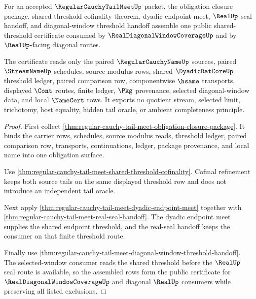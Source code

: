 \begin{theorem}
\label{thm:regular-cauchy-tail-meet-public-shared-threshold-certificate}
For an accepted $\RegularCauchyTailMeetUp$ packet, the obligation closure package, shared-threshold cofinality theorem, dyadic endpoint meet, $\RealUp$ seal handoff, and diagonal-window threshold handoff assemble one public shared-threshold certificate consumed by $\RealDiagonalWindowCoverageUp$ and by $\RealUp$-facing diagonal routes.

The certificate reads only the paired $\RegularCauchyNameUp$ sources, paired $\StreamNameUp$ schedules, source modulus rows, shared $\DyadicRatCoreUp$ threshold ledger, paired comparison row, componentwise $\hsame$ transports, displayed $\Cont$ routes, finite ledger, $\Pkg$ provenance, selected diagonal-window data, and local $\NameCert$ rows. It exports no quotient stream, selected limit, trichotomy, host equality, hidden tail oracle, or ambient completeness principle.
\end{theorem}
\begin{proof}
First collect \autoref{thm:regular-cauchy-tail-meet-obligation-closure-package}. It binds the carrier rows, schedules, source modulus reads, threshold ledger, paired comparison row, transports, continuations, ledger, package provenance, and local name into one obligation surface.

Use \autoref{thm:regular-cauchy-tail-meet-shared-threshold-cofinality}. Cofinal refinement keeps both source tails on the same displayed threshold row and does not introduce an independent tail oracle.

Next apply \autoref{thm:regular-cauchy-tail-meet-dyadic-endpoint-meet} together with \autoref{thm:regular-cauchy-tail-meet-real-seal-handoff}. The dyadic endpoint meet supplies the shared endpoint threshold, and the real-seal handoff keeps the consumer on that finite threshold route.

Finally use \autoref{thm:regular-cauchy-tail-meet-diagonal-window-threshold-handoff}. The selected-window consumer reads the shared threshold before the $\RealUp$ seal route is available, so the assembled rows form the public certificate for $\RealDiagonalWindowCoverageUp$ and diagonal $\RealUp$ consumers while preserving all listed exclusions.
\end{proof}

